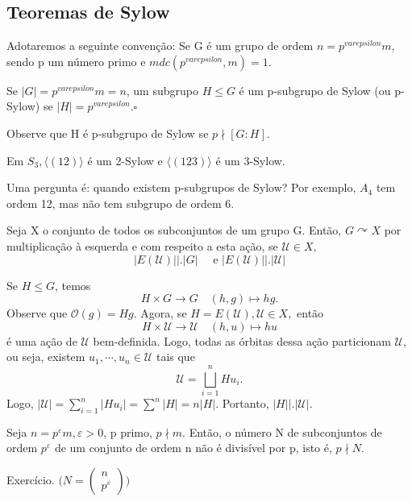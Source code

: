 \documentclass[Algebra/algebra_notes.tex]{subfiles}
\begin{document}
\subsection{Teoremas de Sylow}
Adotaremos a seguinte convenção: Se G é um grupo de ordem \(n=p^{varepsilon}m\),
sendo p um número primo e \(mdc(p^{varepsilon}, m) = 1.\)
\begin{def*}
	Se \(|G| = p^{varepsilon}m = n\), um subgrupo \(H\leq G\) é um p-subgrupo de Sylow (ou p-Sylow) se
	\(|H| = p^{varepsilon}.\square\)
\end{def*}
Observe que H é p-subgrupo de Sylow se \(p\nmid [G:H].\)
\begin{example*}
	Em \(S_{3}, \langle (12) \rangle\) é um 2-Sylow e \(\langle (123) \rangle\) é um 3-Sylow.
\end{example*}
Uma pergunta é: quando existem p-subgrupos de Sylow? Por exemplo, \(A_{4}\) tem
ordem 12, mas não tem subgrupo de ordem 6.
\begin{lemma*}
	Seja X o conjunto de todos os subconjuntos de um grupo G. Então, \(G \curvearrowright X\) por multiplicação
	à esquerda e com respeito a esta ação, se \(\mathcal{U}\in X,\)
	\[
		|E(\mathcal{U})|\biggl|\biggr.|G|\quad\text{ e } |E(\mathcal{U})|\biggl|\biggr.|\mathcal{U}|
	\]
\end{lemma*}
\begin{proof*}
	Se \(H\leq G\), temos
	\[
		H\times G\rightarrow G\quad (h, g)\mapsto hg.
	\]
	Observe que \(\mathcal{O}(g) = Hg\). Agora, se \(H = E(\mathcal{U}), \mathcal{U}\in X,\) então
	\[
		H\times \mathcal{U}\rightarrow \mathcal{U} \quad (h, u)\mapsto hu
	\]
	é uma ação de \(\mathcal{U}\) bem-definida. Logo, todas as órbitas dessa ação particionam \(\mathcal{U},\) ou seja,
	existem \(u_{1}, \cdots, u_{n}\in \mathcal{U}\) tais que
	\[
		\mathcal{U} = \bigsqcup_{i=1}^{n}{Hu_{i}}.
	\]
	Logo, \(|\mathcal{U}| = \sum\limits_{i=1}^{n}|Hu_{i}| = \sum\limits_{}^{n}|H| = n|H|.\)
	Portanto, \(|H|\biggl|\biggr.|\mathcal{U}|.\) \qedsymbol
\end{proof*}
\begin{lemma*}
	Seja \(n=p^{\varepsilon }m, \varepsilon >0\), p primo, \(p\nmid m.\) Então,
	o número N de subconjuntos de ordem \(p^{\varepsilon }\) de um conjunto de ordem n não
	é divisível por p, isto é, \(p\nmid N\).
\end{lemma*}
\begin{proof*}
	Exercício. \(\biggl(N = \begin{pmatrix}
		n \\
		p^{\varepsilon }
	\end{pmatrix}\biggr)\)
\end{proof*}
\end{document}
